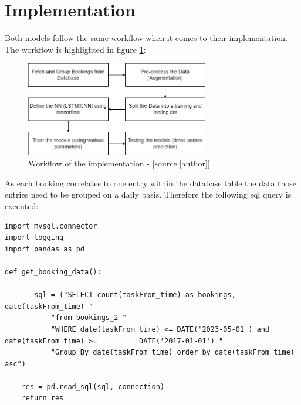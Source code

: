 \section{Implementation}
\label{sec:implementation}
Both models follow the same workflow when it comes to their implementation. The workflow is highlighted in figure \ref{fig:workflow}:

\begin{figure}[H]
	\centering
		\includegraphics[width=8cm]{images/workflow_imp}
	\caption{Workflow of the implementation - [source:[author]]}
	\label{fig:workflow}
\end{figure}

As each booking correlates to one entry within the database table the data those entries need to be grouped on a daily basis. Therefore the following sql query is executed: 
\begin{lstlisting}
import mysql.connector
import logging
import pandas as pd

def get_booking_data():

       sql = ("SELECT count(taskFrom_time) as bookings, date(taskFrom_time) "
           "from bookings_2 "
           "WHERE date(taskFrom_time) <= DATE('2023-05-01') and date(taskFrom_time) >= 			DATE('2017-01-01') "
           "Group By date(taskFrom_time) order by date(taskFrom_time) asc")

    res = pd.read_sql(sql, connection)
    return res
\end{lstlisting}

